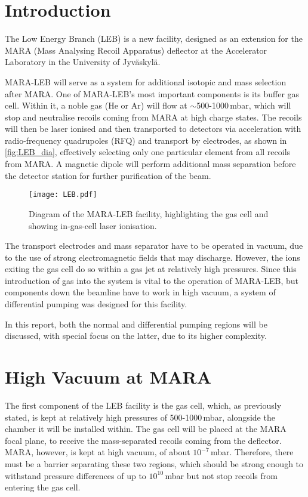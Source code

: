 





\section{Introduction}
\label{sec:intro}
The Low Energy Branch (LEB) is a new facility, designed as an extension for the MARA (Mass Analysing Recoil Apparatus) deflector at the Accelerator Laboratory in the University of Jyväskylä.

MARA-LEB will serve as a system for additional isotopic and mass selection after MARA. One of MARA-LEB's most important components is its buffer gas cell. Within it, a noble gas (He or Ar) will flow at $\sim$500-1000\,mbar, which will stop and neutralise recoils coming from MARA at high charge states. The recoils will then be laser ionised and then transported to detectors via acceleration with radio-frequency quadrupoles (RFQ) and transport by electrodes, as shown in \autoref{fig:LEB_dia}, effectively selecting only one particular element from all recoils from MARA. A magnetic dipole will perform additional mass separation before the detector station for further purification of the beam.

\begin{figure}[H]
    \centering
    \texttt{[image: LEB.pdf]}    
    \caption[The MARA-LEB facility]{Diagram of the MARA-LEB facility, highlighting the gas cell and showing in-gas-cell laser ionisation.}
    \label{fig:LEB_dia}
\end{figure}

The transport electrodes and mass separator have to be operated in vacuum, due to the use of strong electromagnetic fields that may discharge. However, the ions exiting the gas cell do so within a gas jet at relatively high pressures. Since this introduction of gas into the system is vital to the operation of MARA-LEB, but components down the beamline have to work in high vacuum, a system of {differential pumping} was designed for this facility. 

In this report, both the normal and differential pumping regions will be discussed, with special focus on the latter, due to its higher complexity. 
\newpage

\section{High Vacuum at MARA}
\label{sec:mara}
The first component of the LEB facility is the gas cell, which, as previously stated, is kept at relatively high pressures of 500-1000\,mbar, alongside the chamber it will be installed within. The gas cell will be placed at the MARA focal plane, to receive the mass-separated recoils coming from the deflector. MARA, however, is kept at high vacuum, of about $10^{-7}$\,mbar. Therefore, there must be a barrier separating these two regions, which should be strong enough to withstand pressure differences of up to  $10^{10}$\,mbar but not stop recoils from entering the gas cell.

